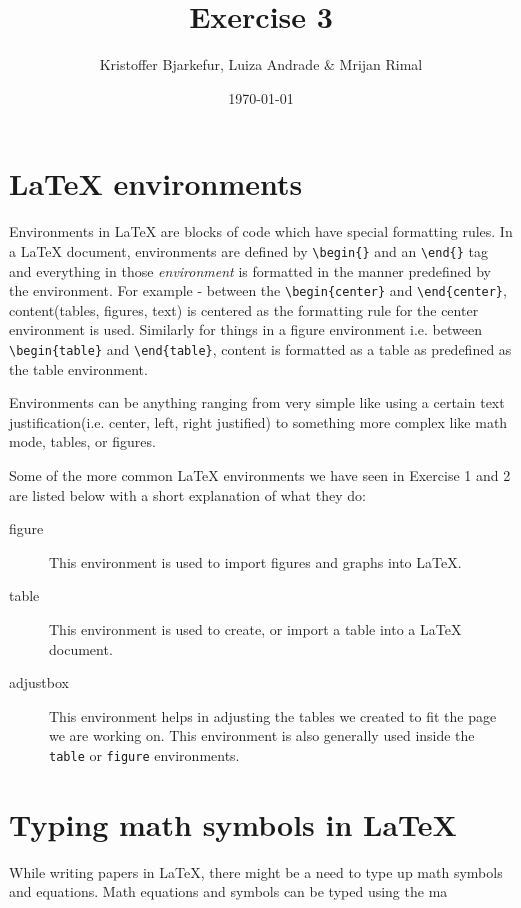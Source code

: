 \documentclass{article}            %
\title{Exercise 3} 	%
\author{Kristoffer Bjarkefur, Luiza Andrade \& Mrijan Rimal}
\date{\today}                    							%
\begin{document}

\maketitle
\newpage

\section*{{\LaTeX} environments}
Environments in {\LaTeX} are blocks of code which have special formatting rules. In a {\LaTeX} document, environments are defined by \verb|\begin{}| and an \verb|\end{}| tag and everything in those \textit{environment} is formatted in the manner predefined by the environment. For example - between the \verb|\begin{center}| and \verb|\end{center}|, content(tables, figures, text) is centered as the formatting rule for the center environment is used. Similarly for things in a figure environment i.e. between \verb|\begin{table}| and \verb|\end{table}|, content is formatted as a table as predefined as the table environment. 

Environments can be anything ranging from very simple like using a certain text justification(i.e. center, left, right justified) to something more complex like math mode, tables, or figures. 

Some of the more common {\LaTeX} environments we have seen in Exercise 1 and 2 are listed below with a short explanation of what they do: 

\begin{description}
	\item[figure] This environment is used to import figures and graphs into {\LaTeX}. 
	\item[table] This environment is used to create, or import a table into a {\LaTeX} document.
	\item[adjustbox] This environment helps in adjusting the tables we created to fit the page we are working on. This environment is also generally used inside the \texttt{table} or \texttt{figure} environments.
	
\end{description} 
\section*{Typing math symbols in {\LaTeX}}
While writing papers in {\LaTeX}, there might be a need to type up math symbols and equations. Math equations and symbols can be typed using the ma
\end{document}
